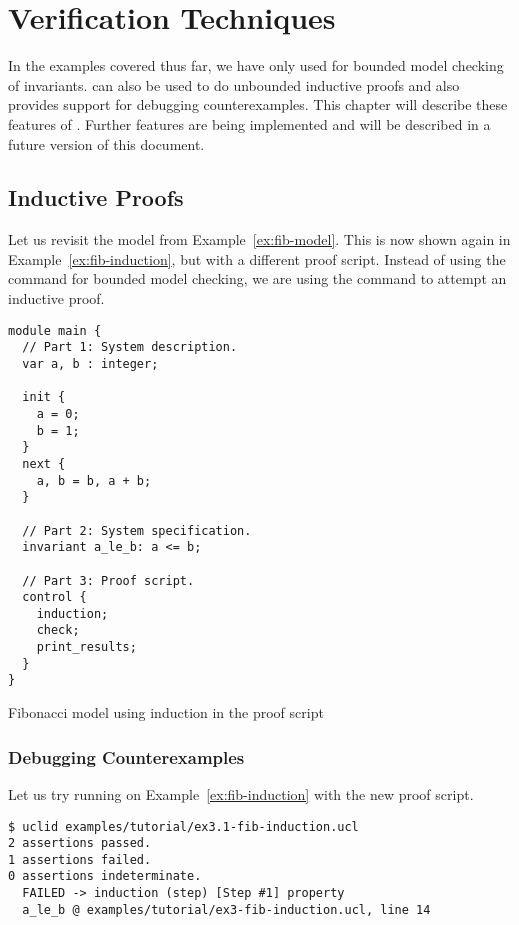\chapter{Verification Techniques}
\label{ch:verif}

In the examples covered thus far, we have only used \uclid{} for bounded model checking of invariants. 
\uclid{} can also be used to do unbounded inductive proofs and also provides support for debugging counterexamples. This chapter will describe these features of \uclid{}. Further features are being implemented and will be described in a future version of this document.

\section{Inductive Proofs} %
Let us revisit the model from Example~\ref{ex:fib-model}. This is now shown again in Example~\ref{ex:fib-induction}, but with a different proof script. Instead of using the  command for bounded model checking, we are using the  command to attempt an inductive proof.

\begin{uclidlisting}[htbp]
\begin{lstlisting}[language=uclid,style=uclidstyle]
module main {
  // Part 1: System description.
  var a, b : integer;

  init {
    a = 0;
    b = 1;
  }
  next {
    a, b = b, a + b;
  }

  // Part 2: System specification.
  invariant a_le_b: a <= b;

  // Part 3: Proof script.
  control {
    induction;
    check;
    print_results;
  }
}
\end{lstlisting}
\label{ex:fib-induction}
\caption{\uclid{} Fibonacci model using induction in the proof script}
\end{uclidlisting}

\subsection{Debugging Counterexamples}

Let us try running \uclid{} on Example~\ref{ex:fib-induction} with the new proof script.
\begin{Verbatim}[frame=single, samepage=true]
$ uclid examples/tutorial/ex3.1-fib-induction.ucl 
2 assertions passed.
1 assertions failed.
0 assertions indeterminate.
  FAILED -> induction (step) [Step #1] property 
  a_le_b @ examples/tutorial/ex3-fib-induction.ucl, line 14
\end{Verbatim}

